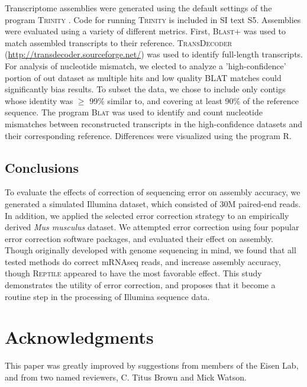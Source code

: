 \documentclass[11pt]{article}
\begin{document}
\noindent
Transcriptome assemblies were generated using the default settings of the program \textsc{Trinity} \citep{Grabherr:2011jb}.  Code for running \textsc{Trinity} is included in SI text S5. Assemblies were evaluated using a variety of different metrics. First, \textsc{Blast+} \citep{Camacho:2009fc} was used to match assembled transcripts to their reference.  \textsc{TransDecoder} (\url{http://transdecoder.sourceforge.net/}) was used to identify full-length transcripts. For analysis of nucleotide mismatch, we elected to analyze a 'high-confidence' portion of out dataset as multiple hits and low quality BLAT matches could significantly bias results. To subset the data, we chose to include only contigs whose identity was $\geq$ 99\% similar to, and covering at least 90\% of the reference sequence.  The program \textsc{Blat} \citep{Kent:2002jd} was used to identify and count nucleotide mismatches between reconstructed transcripts in the high-confidence datasets and their corresponding reference.  Differences were visualized using the program R. \\

\subsection*{Conclusions}
To evaluate the effects of correction of sequencing error on assembly accuracy, we generated a simulated Illumina dataset, which consisted of 30M paired-end reads.  In addition, we applied the selected error correction strategy to an empirically derived \textit{Mus musculus} dataset. We attempted error correction using four popular error correction software packages, and evaluated their effect on assembly.  Though originally developed with genome sequencing in mind, we found that all tested methods do correct mRNAseq reads, and increase assembly accuracy, though \textsc{Reptile} appeared to have the most favorable effect. This study demonstrates the utility of error correction, and proposes that it become a routine step in the processing of Illumina sequence data. \\



\section*{Acknowledgments}
This paper was greatly improved by suggestions from members of the Eisen Lab, and from two named reviewers, C. Titus Brown and Mick Watson.  
\end{document}
